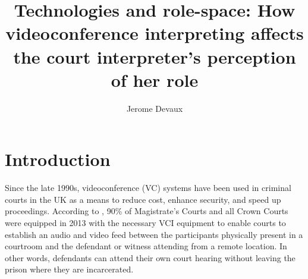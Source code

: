 \documentclass[output=paper]{langsci/langscibook}
\author{Jerome Devaux\affiliation{affiliation}}
\title{Technologies and role-space: How videoconference interpreting affects the court interpreter’s perception of her role}
\begin{document}

 

 

 

 

 

 

 

 

 

 

 

\section{Introduction}
Since the late 1990s, videoconference (\textsc{VC}) systems have been used in criminal courts in the UK \citep{Plotnikoff1999, Plotnikoff2000} as a means to reduce cost, enhance security, and speed up proceedings. According to \citep{Braun2016b}, 90\% of Magistrate’s Courts and all Crown Courts were equipped in 2013 with the necessary \textsc{VCI} equipment to enable courts to establish an audio and video feed between the participants physically present in a courtroom and the defendant or witness attending from a remote location. In other words, defendants can attend their own court hearing without leaving the prison where they are incarcerated. 
\end{document}

